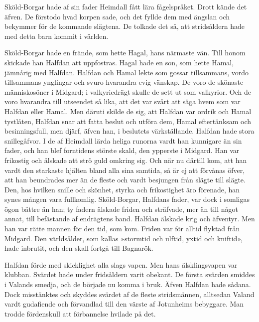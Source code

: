 Sköld-Borgar hade af sin fader Heimdall fått lära fågelspråket. Drott
kände det äfven. De förstodo hvad korpen sade, och det fyllde dem med
ängslan och bekymmer för de kommande slägtena. De tolkade det så, att
stridsåldern hade med detta barn kommit i världen.

Sköld-Borgar hade en frände, som hette Hagal, hans närmaste vän. Till
honom skickade han Halfdan att uppfostras. Hagal hade en son, som hette
Hamal, jämnårig med Halfdan. Halfdan och Hamal lekte som gossar
tillsammans, vordo tillsammans ynglingar och svuro hvarandra evig
vänskap. De voro de skönaste människosöner i Midgard; i valkyriedrägt
skulle de sett ut som valkyrior. Och de voro hvarandra till utseendet så
lika, att det var svårt att säga hvem som var Halfdan eller Hamal. Men
däruti skilde de sig, att Halfdan var ordrik och Hamal tystlåten,
Halfdan snar att fatta beslut och utföra dem, Hamal eftertänksam och
besinningsfull, men djärf, äfven han, i beslutets värkställande. Halfdan
hade stora snillegåfvor. I de af Heimdall lärda heliga runorna vardt han
kunnigare än sin fader, och han blef forntidens störste skald, den
ypperste i Midgard. Han var frikostig och älskade att strö guld omkring
sig. Och när nu därtill kom, att han vardt den starkaste hjälten bland
alla sina samtida, så är ej att förvånas öfver, att han beundrades mer
än de fleste och vardt besjungen från slägte till slägte. Den, hos
hvilken snille och skönhet, styrka och frikostighet äro förenade, han
synes mången vara fullkomlig. Sköld-Borgar, Halfdans fader, var dock i
somligas ögon bättre än han; ty fadern älskade friden och sträfvade, mer
än till något annat, till befästande af endrägtens band. Halfdan älskade
krig och äfventyr. Men han var rätte mannen för den tid, som kom. Friden
var för alltid flyktad från Midgard. Den världsålder, som kallas
»stormtid och ulftid, yxtid och kniftid», hade inbrutit, och den skall
fortgå till Bagnarök.

\protect\hypertarget{lb1625905.xhtmlux5cux23start95}{}{}\protect\hypertarget{lb1625905.xhtmlux5cux23start95-a}{}{}\protect\hypertarget{lb1625905.xhtmlux5cux23start95-b}{}{}\protect\hypertarget{lb1625905.xhtmlux5cux23start95-c}{}{}\protect\hypertarget{lb1625905.xhtmlux5cux23start95-d}{}{}

Halfdan förde med skicklighet alla slags vapen. Men hans älsklingsvapen
var klubban. Svärdet hade under fridsåldern varit obekant. De första
svärden smiddes i Valands smedja, och de började nu komma i bruk. Äfven
Halfdan hade sådana. Dock misstänktes och skyddes svärdet af de fleste
stridsmännen, alltsedan Valand vardt gudafiende och förvandlad till den
värste af Jotunheims bebyggare. Man trodde fördenskull att förbannelse
hvilade på det.

